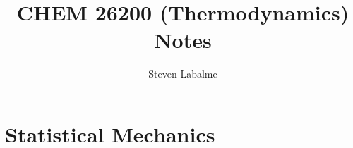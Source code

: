 \documentclass{report}
\title{CHEM 26200 (Thermodynamics) Notes}
\author{Steven Labalme}
\renewcommand{\chaptername}{Week}
\begin{document}
\maketitle



\tableofcontents
\listoffigures
\newpage



\pagestyle{main}
\renewcommand{\chaptermark}[1]{\markboth{\chaptername\ \thechapter\ (#1)}{}}
\part{Statistical Mechanics}




\printbibliography[heading=bibintoc]
\end{document}
